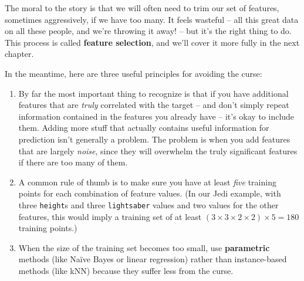 
The moral to the story is that we will often need to trim our set of features,
sometimes aggressively, if we have too many. It feels wasteful -- all this
great data on all these people, and we're throwing it away! -- but it's the
right thing to do. This process is called \textbf{feature selection}, and
we'll cover it more fully in the next chapter.

\smallskip
In the meantime, here are three useful principles for avoiding the curse:

\begin{enumerate}

\item By far the most important thing to recognize is that if you have
additional features that are \textit{truly} correlated with the target -- and
don't simply repeat information contained in the features you already have --
it's okay to include them. Adding more stuff that actually contains useful
information for prediction isn't generally a problem. The problem is when you
add features that are largely \textit{noise}, since they will overwhelm the
truly significant features if there are too many of them.

\item A common rule of thumb is to make sure you have at least \textit{five}
training points for each combination of feature values. (In our Jedi example,
with three \texttt{height}s and three \texttt{lightsaber} values and two
values for the other features, this would imply a training set of at least $(3
\times 3 \times 2 \times 2) \times 5 = 180$ training points.)


\item When the size of the training set becomes too small, use
\textbf{parametric} methods (like Na\"{i}ve Bayes or linear regression) rather
than instance-based methods (like kNN) because they suffer less from the curse.

\end{enumerate}